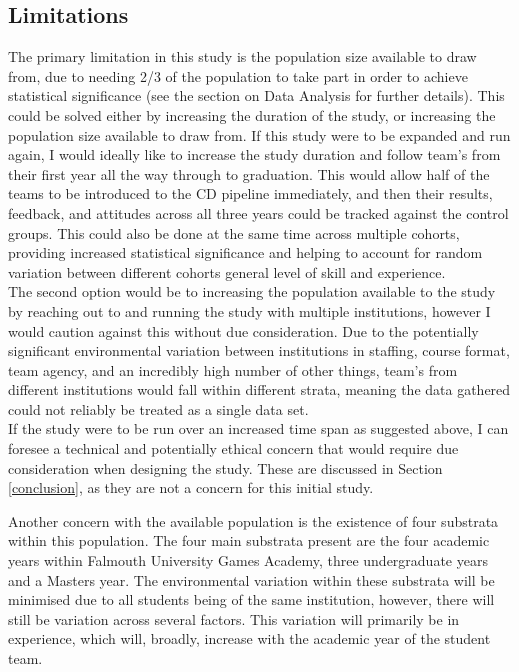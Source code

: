 \documentclass[journal]{IEEEtran}
\begin{document}
\subsection{Limitations} \label{Limitations}
The primary limitation in this study is the population size available to draw from, due to needing 2/3 of the population to take part in order to achieve statistical significance (see the section on Data Analysis for further details). This could be solved either by increasing the duration of the study, or increasing the population size available to draw from. If this study were to be expanded and run again, I would ideally like to increase the study duration and follow team's from their first year all the way through to graduation. This would allow half of the teams to be introduced to the CD pipeline immediately, and then their results, feedback, and attitudes across all three years could be tracked against the control groups. This could also be done at the same time across multiple cohorts, providing increased statistical significance and helping to account for random variation between different cohorts general level of skill and experience. \\
The second option would be to  increasing the population available to the study by reaching out to and running the study with multiple institutions, however I would caution against this without due consideration. Due to the potentially significant environmental variation between institutions in staffing, course format, team agency, and an incredibly high number of other things, team's from different institutions would fall within different strata, meaning the data gathered could not reliably be treated as a single data set. \\
If the study were to be run over an increased time span as suggested above, I can foresee a technical and potentially ethical concern that would require due consideration when designing the study. These are discussed in Section \ref{conclusion}, as they are not a concern for this initial study.

Another concern with the available population is the existence of four substrata within this population. The four main substrata present are the four academic years within Falmouth University Games Academy, three undergraduate years and a Masters year. The environmental variation within these substrata will be minimised due to all students being of the same institution, however, there will still be variation across several factors. This variation will primarily be in experience, which will, broadly, increase with the academic year of the student team.
\end{document}
